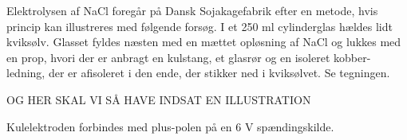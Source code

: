 

\forfatter{}

Elektrolysen af NaCl foregår på Dansk Sojakagefabrik efter en metode, hvis
princip kan illustreres med følgende forsøg.
I et 250 ml cylinderglas hældes lidt kviksølv. Glasset fyldes næsten med en
mættet opløsning af NaCl og lukkes med en prop, hvori der er anbragt en
kulstang, et glasrør og en isoleret kobber-ledning, der er afisoleret i den
ende, der stikker ned i kviksølvet. Se tegningen.

OG HER SKAL VI SÅ HAVE INDSAT EN ILLUSTRATION

 Kulelektroden forbindes med plus-polen på en 6 V
spændingskilde.
